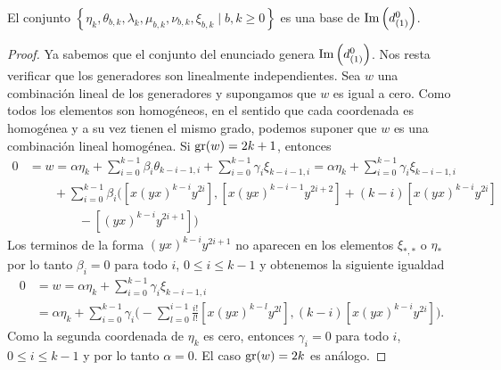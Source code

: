 \documentclass[fleqn,../tesis.tex]{subfiles}
\begin{document}
\begin{prop}\label{coh_ima_d01}
    El conjunto $\left\lbrace \eta_k, \theta_{b , k}, \lambda_k, \mu_{b , k}, \nu_{b, k}, \xi_{b, k} \mid b, k \geq 0 \right\rbrace$
    es una base de $\operatorname{Im}\left(d^{0}_{(1)}\right)$.
\end{prop}
\begin{proof}
    Ya sabemos que el conjunto del enunciado genera $\operatorname{Im}\left(d^{0}_{(1)}\right)$. Nos resta verificar que los generadores son linealmente
    independientes. Sea $w$ una combinación lineal de los generadores y supongamos que $w$ es igual a cero. Como todos los elementos son homogéneos, en el sentido que cada
    coordenada es homogénea y a su vez tienen el mismo grado, podemos suponer que $w$ es una combinación lineal homogénea. Si $\operatorname{gr}(w) = 2k + 1$,
    entonces
    \begin{align*}
        0 &= w = \alpha \eta_k + \sum_{i = 0}^{k - 1} \beta_i \theta_{k -i - 1, i} + \sum_{i = 0}^{k - 1}\gamma_i \xi_{k - i - 1, i}
        = \alpha \eta_k + \sum_{i = 0}^{k - 1}\gamma_i \xi_{k - i - 1, i}\\
        &\qquad + \sum_{i = 0}^{k - 1} \beta_i \Bigg(\left[x(yx)^{k - i}y^{2i}\right],
            \left[x(yx)^{k - i - 1}y^{2i + 2}\right] + (k - i)\left[x(yx)^{k - i}y^{2i}\right]\\
            &\qquad \qquad - \left[(yx)^{k - i}y^{2i + 1}\right]\Bigg)
    \end{align*}
    Los terminos de la forma $(yx)^{k - i}y^{2i + 1}$ no aparecen en los elementos $\xi_{\ast, \ast}$ o $\eta_{\ast}$ por lo tanto $\beta_i = 0$ para todo $i$, $0 \leq i \leq k - 1$ y obtenemos la siguiente igualdad
    \begin{align*}
        0 &= w = \alpha \eta_k +  \sum_{i = 0}^{k - 1}\gamma_i \xi_{k - i - 1, i} \\
        &= \alpha \eta_k + \sum_{i = 0}^{k - 1}\gamma_i \Bigg(-\sum_{l = 0}^{i - 1}\frac{i!}{l!}\left[x(yx)^{k - l}y^{2l}\right],
                  (k - i)\left[x(yx)^{k - i}y^{2i}\right]\Bigg).
    \end{align*}
    Como la segunda coordenada de $\eta_k$ es cero, entonces $\gamma_i = 0$ para todo $i$, $0 \leq i \leq k - 1$ y por lo tanto
    $\alpha = 0$. El caso $\operatorname{gr}(w) = 2k$ es análogo.
\end{proof}
\end{document}
